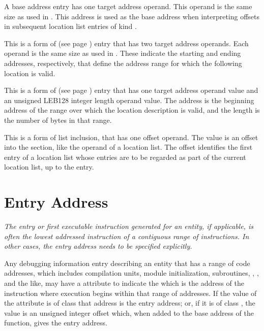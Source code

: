 \begin{enumerate}[1. ]
\addtocounter{enumi}{5}
\itembfnl{\DWRLEbaseaddressTARG}
A base address entry has one target address operand.
This operand is the same size as used in \DWFORMaddr.
This address is used as the base address when interpreting
offsets in subsequent location list entries of kind
\DWRLEoffsetpair.

\itembfnl{\DWRLEstartendTARG}
This is a form of  
\bb
(see page \pageref{text:bndrng})
\eb
entry that has two target address operands. Each
operand is the same size as used in \DWFORMaddr.
These indicate the starting and ending addresses,
respectively, that define the address range for which
the following location is valid.
       
\itembfnl{\DWRLEstartlengthTARG}
This is a form of  
\bb
(see page \pageref{text:bndrng})
\eb
entry that has one target address operand value and an unsigned LEB128
integer length operand value. The address is the beginning address
of the range over which the location description is valid, and
the length is the number of bytes in that range.

\bb
\itembfnl{\DWRLEincludernglistTARG}
This is a form of list inclusion, that has one offset operand.  The
value is an offset into the \dotdebugrnglists{} section, like the
operand of a \DWFORMsecoffset{} location list.  The offset identifies the
first entry of a location list whose entries are to be regarded as part of
the current location list, up to the \DWRLEendoflist{} entry.
\eb

\end{enumerate}

\section{Entry Address}
\label{chap:entryaddress}
\textit{The entry or first executable instruction generated
for an entity, if applicable, is often the lowest addressed
instruction of a contiguous range of instructions. In other
cases, the entry address needs to be specified explicitly.}

Any debugging information entry describing an entity that has
a range of code addresses, which includes compilation units,
module initialization, subroutines, 
,
,
and the like, may have a \DWATentrypcDEFN{} attribute 
 to indicate the 
 which is the address of the 
instruction where execution begins 
within that range\hypertarget{chap:entryaddressofscope}{}
of addresses. 
If the value of the \DWATentrypcNAME{} attribute is of
class \CLASSaddress{} that address is the entry address;
or, if it is of class
\CLASSconstant, the value is an unsigned integer offset which, 
when added to the base address of the function, gives the entry
address. 


